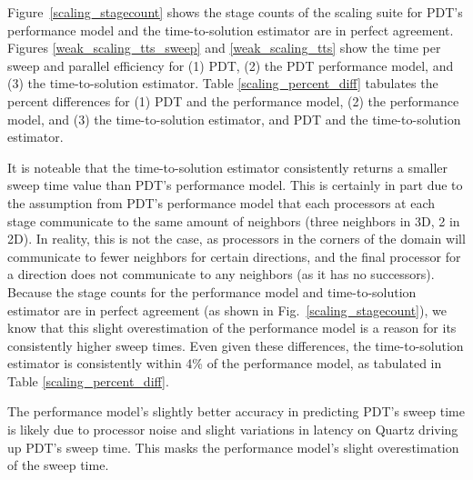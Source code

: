 Figure~\ref{scaling_stagecount} shows the stage counts of the scaling suite for PDT's performance model and the time-to-solution estimator are in perfect agreement.
Figures \ref{weak_scaling_tts_sweep} and \ref{weak_scaling_tts} show the time per sweep and parallel efficiency for (1) PDT, (2) the PDT performance model, and (3) the time-to-solution estimator. Table \ref{scaling_percent_diff} tabulates the percent differences for (1) PDT and the performance model, (2) the performance model, and (3) the time-to-solution estimator, and PDT and the time-to-solution estimator.

It is noteable that the time-to-solution estimator consistently returns a smaller sweep time value than PDT's performance model. This is certainly in part due to the assumption from PDT's performance model that each processors at each stage communicate to the same amount of neighbors (three neighbors in 3D, 2 in 2D).
In reality, this is not the case, as processors in the corners of the domain will communicate to fewer neighbors for certain directions, and the final processor for a direction does not communicate to any neighbors (as it has no successors).
Because the stage counts for the performance model and time-to-solution estimator are in perfect agreement (as shown in Fig.~\ref{scaling_stagecount}), we know that this slight overestimation of the performance model is a reason for its consistently higher sweep times.
Even given these differences, the time-to-solution estimator is consistently within 4\% of the performance model, as tabulated in Table \ref{scaling_percent_diff}.

The performance model's slightly better accuracy in predicting PDT's sweep time is likely due to processor noise and slight variations in latency on Quartz driving up PDT's sweep time. This masks the performance model's slight overestimation of the sweep time.

